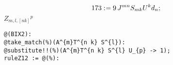 \documentclass[11pt]{article}
\def\specialcolon{\mathrel{\mathop{:}}\hspace{-.5em}}
\begin{document}
\begin{dmath*}[compact, spread=2pt]
173\specialcolon{}= 9\, {J}^{m n} {S}_{m k} {U}^{k} {d}_{n};
\end{dmath*}
$Z_{m,l,[nk]}{}^p$
{\color[named]{Blue}\begin{verbatim}
@(BIX2):
@take_match(%)(A^{m}T^{n k} S^{l}):
@substitute!!(%)(A^{m}T^{n k} S^{l} U_{p} -> 1);
ruleZ12 := @(%):
\end{verbatim}}
\end{document}
